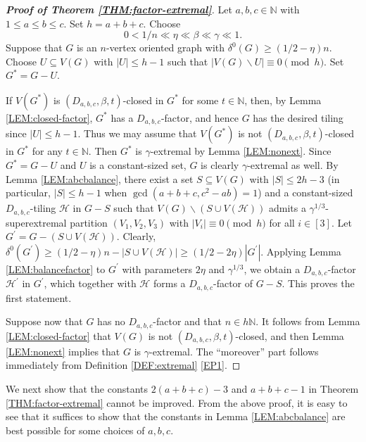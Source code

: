 \documentclass[11pt,a4paper,reqno]{amsart}
\theoremstyle{definition} %
\begin{document}
\begin{proof}[\textbf{Proof of Theorem \ref{THM:factor-extremal}}]
Let $a,b,c\in \mathbb{N}$ with $1\leqslant a\leqslant b\leqslant c$. Set $h=a+b+c$. Choose
$$0< 1/n\ll\eta\ll \beta \ll \gamma \ll 1.$$ 
Suppose that $G$ is an $n$-vertex oriented graph with $\delta^0(G)\geqslant(1/2-\eta)n$. Choose $U\subseteq V(G)$ with $|U|\leqslant h-1$ such that $|V(G)\backslash U|\equiv 0\pmod h$. Set $G^{\ast}=G-U$.

If $V(G^{\ast})$ is $(D_{a,b,c},\beta,t)$-closed in $G^{\ast}$ for some $t\in\mathbb{N}$, then, by Lemma \ref{LEM:closed-factor}, $G^{\ast}$ has a $D_{a,b,c}$-factor, and hence $G$ has the desired tiling since $|U|\leqslant h-1$.  
Thus we may assume that $V(G^{\ast})$ is not $(D_{a,b,c},\beta,t)$-closed in $G^{\ast}$ for any $t\in \mathbb{N}$. Then $G^{\ast}$ is $\gamma$-extremal by Lemma \ref{LEM:nonext}. Since $G^{\ast}=G-U$ and $U$ is a constant-sized set, $G$ is clearly $\gamma$-extremal as well. By Lemma \ref{LEM:abcbalance}, there exist a set $S\subseteq V(G)$ with $|S|\leqslant 2h-3$ (in particular, $|S|\leqslant h-1$ when $\gcd(a+b+c,c^2-ab)=1$) and a constant-sized $D_{a,b,c}$-tiling $\mathcal{H}$ in $G-S$ such that $V(G)\backslash (S\cup V(\mathcal{H}))$ admits a $\gamma^{1/3}$-superextremal partition $(V_1,V_2,V_3)$ with $|V_i|\equiv 0\pmod h$ for all $i\in[3]$. Let $G^{\prime}=G-(S\cup V(\mathcal{H}))$.
Clearly,
$\delta^{0}(G^{\prime})\geqslant (1/2-\eta)n-|S\cup V(\mathcal{H})|\geqslant (1/2-2\eta)|G^\prime|$.
Applying Lemma \ref{LEM:balancefactor} to $G^\prime$ with parameters $2\eta$ and $\gamma^{1/3}$, we obtain a $D_{a,b,c}$-factor $\mathcal{H}^{\prime}$ in $G^{\prime}$, which together with $\mathcal{H}$ forms a $D_{a,b,c}$-factor of $G-S$. This proves the first statement. 

Suppose now that $G$ has no $D_{a,b,c}$-factor and that $n\in h\mathbb{N}$. It follows from Lemma \ref{LEM:closed-factor} that $V(G)$ is not $(D_{a,b,c},\beta,t)$-closed, and then Lemma \ref{LEM:nonext} implies that $G$ is $\gamma$-extremal. The ``moreover'' part follows immediately from Definition \ref{DEF:extremal} \ref{EP1}. 
\end{proof}

We next show that the constants $2(a+b+c)-3$ and $a+b+c-1$ in Theorem \ref{THM:factor-extremal} cannot be improved. From the above proof, it is easy to see that it suffices to show that the constants in Lemma \ref{LEM:abcbalance} are best possible for some choices of $a,b,c$.
\end{document}

